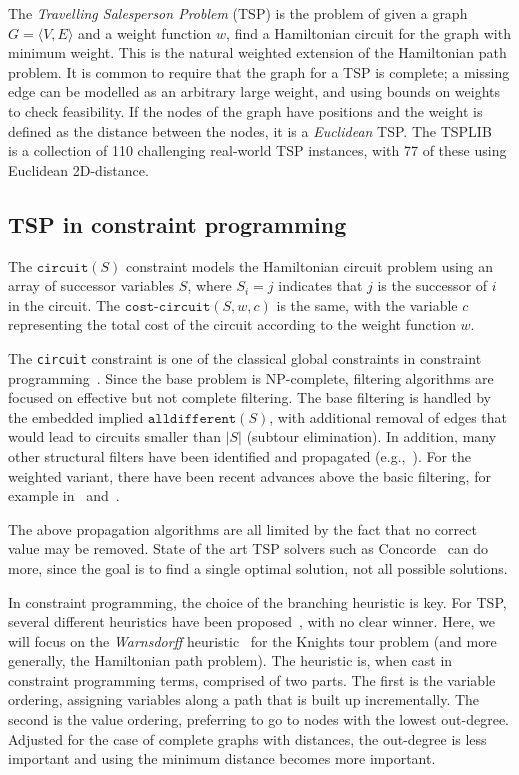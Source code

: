 \documentclass[runningheads]{llncs}
\newcommand{\cons}[1]{\texttt{#1}}
\begin{document}
The \emph{Travelling Salesperson Problem} (TSP) is the problem of
given a graph $G=\langle V,E\rangle$ and a weight function $w$, find a
Hamiltonian circuit for the graph with minimum weight. This is the
natural weighted extension of the Hamiltonian path problem. It is
common to require that the graph for a TSP is complete; a missing edge
can be modelled as an arbitrary large weight, and using bounds on
weights to check feasibility. If the nodes of the graph have positions
and the weight is defined as the distance between the nodes, it is a
\emph{Euclidean} TSP. The TSPLIB~\cite{tsplib} is a collection of 110
challenging real-world TSP instances, with 77 of these using Euclidean
2D-distance.


\subsection{TSP in constraint programming}
\label{sec:tsp-cp}

The $\cons{circuit}(S)$ constraint models the Hamiltonian circuit problem
using an array of successor variables $S$, where $S_i = j$ indicates
that $j$ is the successor of $i$ in the circuit. The
$\cons{cost-circuit}(S,w,c)$ is the same, with the variable $c$
representing the total cost of the circuit according to the weight
function $w$.

The \cons{circuit} constraint is one of the classical global
constraints in constraint programming~\cite{Lauriere78,Beldiceanu94}. Since the base problem is
NP-complete, filtering algorithms are focused on effective but not
complete filtering. The base filtering is handled by the embedded implied
$\cons{alldifferent}(S)$, with additional removal of edges that would lead to
circuits smaller than $|S|$ (subtour elimination). In addition, many other structural filters
have been identified and
propagated (e.g.,~\cite{SchulteTack:CP:2009,Francis14}).  For
the weighted variant, there have been recent advances above the basic
filtering, for example in~\cite{Benchimol12}
and~\cite{Isoart19}.

The above propagation algorithms are all limited by the fact that no
correct value may be removed. State of the art TSP solvers such as
Concorde~\cite{concorde} can do more, since the goal is to find a
single optimal solution, not all possible solutions.

In constraint programming, the choice of the branching heuristic is
key. For TSP, several different heuristics have been
proposed~\cite{Fages16,Isoart19}, with no clear
winner. Here, we will focus on the \emph{Warnsdorff}
heuristic~\cite{wan1823} for the Knights tour problem (and more
generally, the Hamiltonian path problem). The heuristic is, when cast
in constraint programming terms, comprised of two
parts. The first is the variable ordering, assigning variables along a
path that is built up incrementally. The second is the value ordering,
preferring to go to nodes with the lowest out-degree. Adjusted for the
case of complete graphs with distances, the out-degree is less
important and using the minimum distance becomes more important.
\end{document}
